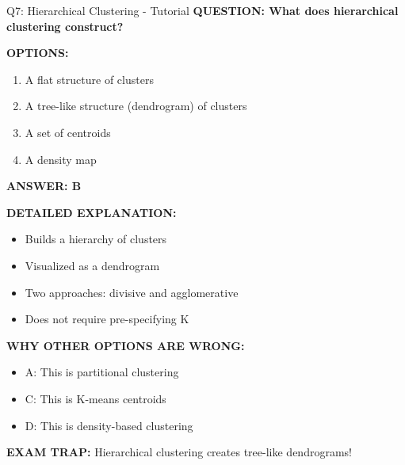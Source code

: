 \documentclass[8pt]{beamer}
\begin{document}
	\begin{frame}{Q7: Hierarchical Clustering - Tutorial}
		\fontsize{6.5}{7.5}\selectfont
		\textbf{QUESTION: What does hierarchical clustering construct?}
		
		\vspace{0.1cm}
		\textbf{OPTIONS:}
		\begin{enumerate}
			\item A flat structure of clusters
			\item A tree-like structure (dendrogram) of clusters
			\item A set of centroids
			\item A density map
		\end{enumerate}
		
		\vspace{0.1cm}
		\textcolor{myblue}{\textbf{ANSWER: B}}
		
		\vspace{0.1cm}
		\textbf{DETAILED EXPLANATION:}
		\begin{itemize}
			\item Builds a hierarchy of clusters
			\item Visualized as a dendrogram
			\item Two approaches: divisive and agglomerative
			\item Does not require pre-specifying K
		\end{itemize}
		
		\vspace{0.1cm}
		\textcolor{myred}{\textbf{WHY OTHER OPTIONS ARE WRONG:}}
		\begin{itemize}
			\item \textcolor{myred}{A:} This is partitional clustering
			\item \textcolor{myred}{C:} This is K-means centroids
			\item \textcolor{myred}{D:} This is density-based clustering
		\end{itemize}
		
		\textcolor{myred}{\textbf{EXAM TRAP:}} Hierarchical clustering creates \textcolor{myblue}{tree-like dendrograms}!
	\end{frame}
	
\end{document}
